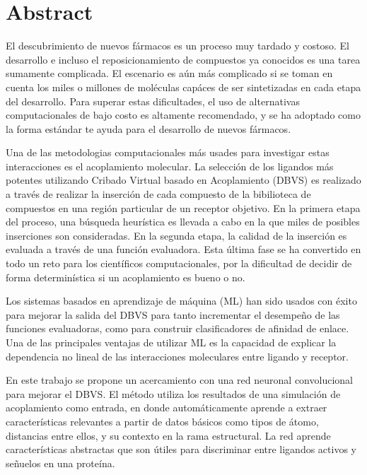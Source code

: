 \section{Abstract}
El descubrimiento de nuevos fármacos es un proceso muy tardado y costoso.
El desarrollo e incluso el reposicionamiento de compuestos ya conocidos es una
tarea sumamente complicada. El escenario es aún más complicado si se toman en cuenta
los miles o millones de moléculas capáces de ser sintetizadas en cada etapa del desarrollo.
Para superar estas dificultades, el uso de alternativas computacionales de bajo costo
es altamente recomendado, y se ha adoptado como la forma estándar te ayuda para el
desarrollo de nuevos fármacos.

Una de las metodologias computacionales más usades para investigar estas interacciones es
el acoplamiento molecular. La selección de los ligandos más potentes utilizando Cribado
Virtual basado en Acoplamiento (DBVS) es realizado a través de realizar la inserción de
cada compuesto de la bibilioteca de compuestos en una región particular de un receptor
objetivo. En la primera etapa del proceso, una búsqueda heurística es llevada a cabo
en la que miles de posibles inserciones son consideradas. En la segunda etapa, la calidad
de la inserción es evaluada a través de una función evaluadora. Esta última fase se ha
convertido en todo un reto para los científicos computacionales, por la dificultad de decidir
de forma determinística si un acoplamiento es bueno o no.

Los sistemas basados en aprendizaje de máquina (ML) han sido usados con éxito para mejorar la
salida del DBVS para tanto incrementar el desempeño de las funciones evaluadoras, como para
construir clasificadores de afinidad de enlace. Una de las principales ventajas de utilizar ML
es la capacidad de explicar la dependencia no lineal de las interacciones moleculares entre
ligando y receptor.

En este trabajo se propone un acercamiento con una red neuronal convolucional para mejorar el
DBVS. El método utiliza los resultados de una simulación de acoplamiento como entrada, en
donde automáticamente aprende a extraer características relevantes a partir de datos básicos
como tipos de átomo, distancias entre ellos, y su contexto en la rama estructural. La red
aprende características abstractas que son útiles para discriminar entre ligandos activos y
señuelos en una proteína.
